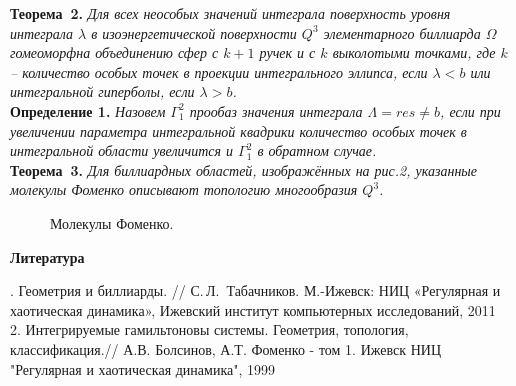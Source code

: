 \textbf{Теорема~2.} {\it Для всех неособых значений интеграла повер\-хность уровня интеграла $\lambda$
	в изоэнергетичес\-кой поверхности $Q^3$ элементарного биллиарда $\Omega$ гомеоморфна объединению сфер с $k+1$ ручек и с $k$ выколотыми точками, где $k$ -- количество особых точек в проекции интегрального эллипса, если $\lambda<b$ или интегральной гиперболы, если $\lambda>b$.} \\
\textbf{Определение 1.} {\it
	Назовем $\Gamma^2_1$ прообаз значения интеграла $\varLambda = res \neq b$, если при увеличении параметра интегральной квадрики количество особых точек в интегральной области увеличится и $\Gamma^2_1$ в обратном случае. } \\
\textbf{Теорема~3.} {\it Для биллиардных областей, изображённых на рис.2, указанные молекулы Фоменко описывают топологию многообразия $Q^3$. }


\begin{figure}[h]
	\caption{Молекулы Фоменко.}
\end{figure}


\smallskip \centerline{\bf Литература}.  Геометрия и биллиарды. // С.\,Л.~Табачников. М.-Ижевск: НИЦ «Регулярная и хаотическая динамика», Ижевский институт компьютерных исследований,
2011 \\
2. Интегрируемые гамильтоновы системы. Геометрия, топология, классификация.// 	А.В. Болсинов, А.Т. Фоменко - том 1. Ижевск НИЦ	"Регулярная и хаотическая динамика", 1999\\


